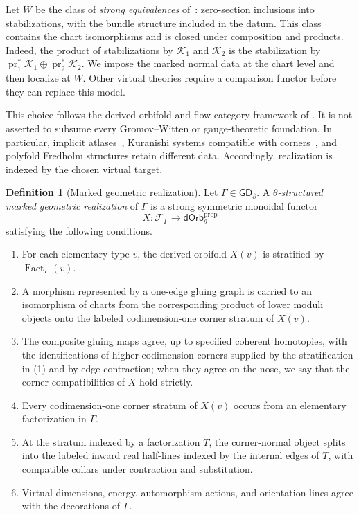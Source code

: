 \documentclass[11pt,letterpaper,twoside]{article}
\theoremstyle{plain}
\theoremstyle{definition}
\newtheorem{definition}[theorem]{Definition}
\theoremstyle{remark}
\let\cite\citep
\newcommand{\namecite}[2]{\citet{#2}}
\newcommand{\BGrm}{\mathsf{GD}_{\partial}}
\newcommand{\dOrb}{\mathsf{dOrb}}
\DeclareMathOperator{\Fact}{Fact}
\begin{document}
Let \(W\) be the class of \emph{strong equivalences} of~\cite{abouzaidblumberg2024}: zero-section inclusions into stabilizations, with the bundle structure included in the datum.  This class contains the chart isomorphisms and is closed under composition and products.  Indeed, the product of stabilizations by \(\mathcal K_1\) and \(\mathcal K_2\) is the stabilization by \(\operatorname{pr}_1^*\mathcal K_1\oplus\operatorname{pr}_2^*\mathcal K_2\).  We impose the marked normal data at the chart level and then localize at \(W\).  Other virtual theories require a comparison functor before they can replace this model.

This choice follows the derived-orbifold and flow-category framework of \namecite{Abouzaid and Blumberg}{abouzaidblumberg2024}.  It is not asserted to subsume every Gromov--Witten or gauge-theoretic foundation.  In particular, implicit atlases~\cite{pardon2016}, Kuranishi systems compatible with corners~\cite{fooo2020}, and polyfold Fredholm structures retain different data.  Accordingly, realization is indexed by the chosen virtual target.

\begin{definition}[Marked geometric realization]\label{def:marked-realization}
Let \(\Gamma\in\BGrm\).  A \emph{\(\theta\)-structured marked geometric realization} of \(\Gamma\) is a strong symmetric monoidal functor
\begin{equation}\label{eq:realization-functor}
 X:\mathcal F_\Gamma\longrightarrow
 \dOrb_\theta^{\mathrm{prop}}
\end{equation}
satisfying the following conditions.
\begin{enumerate}
\item For each elementary type \(v\), the derived orbifold \(X(v)\) is stratified by \(\Fact_\Gamma(v)\).
\item A morphism represented by a one-edge gluing graph is carried to an isomorphism of charts from the corresponding product of lower moduli objects onto the labeled codimension-one corner stratum of \(X(v)\).
\item The composite gluing maps agree, up to specified coherent homotopies, with the identifications of higher-codimension corners supplied by the stratification in (1) and by edge contraction; when they agree on the nose, we say that the corner compatibilities of \(X\) hold strictly.
\item Every codimension-one corner stratum of \(X(v)\) occurs from an elementary factorization in \(\Gamma\).
\item At the stratum indexed by a factorization \(T\), the corner-normal object splits into the labeled inward real half-lines indexed by the internal edges of \(T\), with compatible collars under contraction and substitution.
\item Virtual dimensions, energy, automorphism actions, and orientation lines agree with the decorations of \(\Gamma\).
\end{enumerate}
\end{definition}
\end{document}
